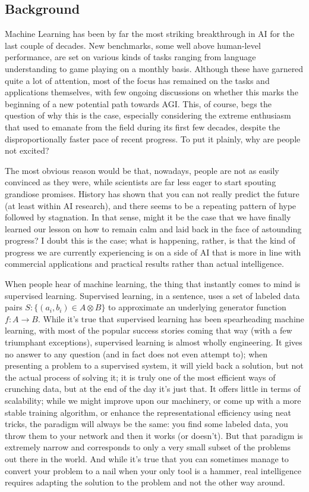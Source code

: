 \documentclass[]{article}
\begin{document}
\subsection{Background}\label{subsec:Background}
Machine Learning has been by far the most striking breakthrough in AI for the last couple of decades. New benchmarks, some well above human-level performance, are set on various kinds of tasks ranging from language understanding to game playing on a monthly basis. Although these have garnered quite a lot of attention, most of the focus has remained on the tasks and applications themselves, with few ongoing discussions on whether this marks the beginning of a new potential path towards AGI. This, of course, begs the question of why this is the case, especially considering the extreme enthusiasm that used to emanate from the field during its first few decades, despite the disproportionally faster pace of recent progress. To put it plainly, why are people not excited?

The most obvious reason would be that, nowadays, people are not as easily convinced as they were, while scientists are far less eager to start spouting grandiose promises. History has shown that you can not really predict the future (at least within AI research), and there seems to be a repeating pattern of hype followed by stagnation. In that sense, might it be the case that we have finally learned our lesson on how to remain calm and laid back in the face of astounding progress?
I doubt this is the case; what is happening, rather, is that the kind of progress we are currently experiencing is on a side of AI that is more in line with commercial applications and practical results rather than actual intelligence.

When people hear of machine learning, the thing that instantly comes to mind is supervised learning. Supervised learning, in a sentence, uses a set of labeled data pairs $S: \{ (a_i, b_i) \in A \otimes B \}$ to approximate an underlying generator function $f: A \rightarrow B$. While it's true that supervised learning has been spearheading machine learning, with most of the popular success stories coming that way (with a few triumphant exceptions), supervised learning is almost wholly engineering. It gives no answer to any question (and in fact does not even attempt to); when presenting a problem to a supervised system, it will yield back a solution, but not the actual process of solving it; it is truly one of the most efficient ways of crunching data, but at the end of the day it's just that. It offers little in terms of scalability; while we might improve upon our machinery, or come up with a more stable training algorithm, or enhance the representational efficiency using neat tricks, the paradigm will always be the same: you find some labeled data, you throw them to your network and then it works (or doesn't). But that paradigm is extremely narrow and corresponds to only a very small subset of the problems out there in the world. And while it's true that you can sometimes manage to convert your problem to a nail when your only tool is a hammer, real intelligence requires adapting the solution to the problem and not the other way around.
\end{document}
